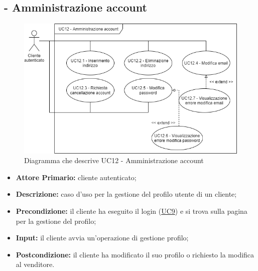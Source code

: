 \stepUserCase
\subsection{ - Amministrazione account}
\begin{figure}[H]
    \centering
    \includegraphics[width=\linewidth]{res/images/UC/UC12.png}
    \caption{Diagramma che descrive UC12 - Amministrazione account}
\end{figure}
\begin{itemize}
    \item \textbf{Attore Primario:} cliente autenticato;
    \item \textbf{Descrizione:} caso d'uso per la gestione del profilo utente di un cliente;
    \item \textbf{Precondizione:} il cliente ha eseguito il login (\hyperref[UC9]{UC9}) e si trova sulla pagina per la gestione del profilo;
    \item \textbf{Input:} il cliente avvia un'operazione di gestione profilo;
    \item \textbf{Postcondizione:} il cliente ha modificato il suo profilo o richiesto la modifica al venditore.
\end{itemize}

\stepsubUserCase
